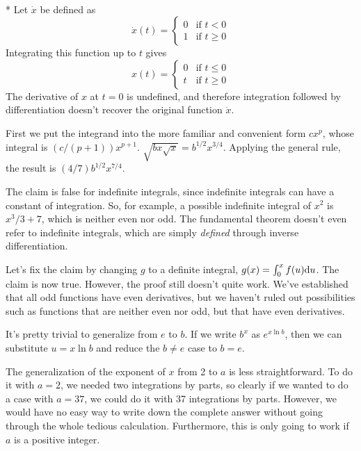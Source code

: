\\*
Let $\dot{x}$ be defined as
\begin{equation*}
  \dot{x}(t) = 
    \begin{cases}
      0  & \text{if $t < 0$}\\
      1  & \text{if $t \ge 0$}
    \end{cases}
\end{equation*}
Integrating this function up to $t$ gives
\begin{equation*}
  x(t) = 
    \begin{cases}
      0  & \text{if $t \le 0$}\\
      t  & \text{if $t \ge 0$}
    \end{cases}
\end{equation*}
The derivative of $x$ at $t=0$ is undefined, and therefore
integration followed by differentiation doesn't recover
the original function $\dot{x}$.

First we put the integrand into the more familiar and convenient form $cx^p$, whose integral is $(c/(p+1))x^{p+1}$.
$\sqrt{bx\sqrt{x}}=b^{1/2}x^{3/4}$. Applying the general rule, the result is $(4/7)b^{1/2}x^{7/4}$.

The claim is false for indefinite integrals, since indefinite integrals can have a constant of integration.
So, for example, a possible indefinite integral of $x^2$ is $x^3/3+7$, which is neither even nor odd.
The fundamental theorem doesn't even refer to indefinite integrals, which are simply \emph{defined} 
through inverse differentiation.

Let's fix the claim by changing $g$ to a definite integral, $g(x)=\int_0^x f(u)\textup{d} u$.
The claim is now true. However, the proof still doesn't quite work. We've established that
all odd functions have even derivatives, but we haven't ruled out possibilities such as
functions that are neither even nor odd, but that have even derivatives.


It's pretty trivial to generalize from $e$ to $b$. If we write $b^x$ as $e^{x\ln b}$, then
we can substitute $u=x \ln b$ and reduce the $b\ne e$ case to $b=e$.

The generalization of the exponent of $x$ from 2 to $a$ is less straightforward. To do it
with $a=2$, we needed two integrations by parts, so clearly if we wanted to do a case with
$a=37$, we could do it with 37 integrations by parts. However, we would  have no easy way to
write down the complete answer without going through the whole tedious calculation. Furthermore,
this is only going to work if $a$ is a positive integer.

